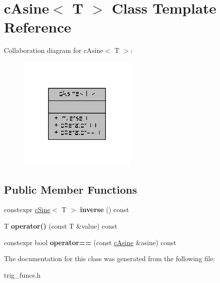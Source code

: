 \hypertarget{classcAsine}{\section{c\-Asine$<$ T $>$ Class Template Reference}
\label{classcAsine}
}


Collaboration diagram for c\-Asine$<$ T $>$\-:
\nopagebreak
\begin{figure}[H]
\begin{center}
\leavevmode
\includegraphics[width=166pt]{classcAsine__coll__graph}
\end{center}
\end{figure}
\subsection*{Public Member Functions}
\begin{DoxyCompactItemize}
\item 
\hypertarget{classcAsine_aeefc00cb700b6befd30b906370631eb5}{constexpr \hyperlink{classcSine}{c\-Sine}$<$ T $>$ {\bfseries inverse} () const }\label{classcAsine_aeefc00cb700b6befd30b906370631eb5}

\item 
\hypertarget{classcAsine_a9eab174ec1cef51d516df5c44c26bc06}{T {\bfseries operator()} (const T \&value) const }\label{classcAsine_a9eab174ec1cef51d516df5c44c26bc06}

\item 
\hypertarget{classcAsine_affbeadd64fbbd3b64e42dd903d9a9430}{constexpr bool {\bfseries operator==} (const \hyperlink{classcAsine}{c\-Asine} \&asine) const }\label{classcAsine_affbeadd64fbbd3b64e42dd903d9a9430}

\end{DoxyCompactItemize}


The documentation for this class was generated from the following file\-:\begin{DoxyCompactItemize}
\item 
trig\-\_\-funcs.\-h\end{DoxyCompactItemize}
